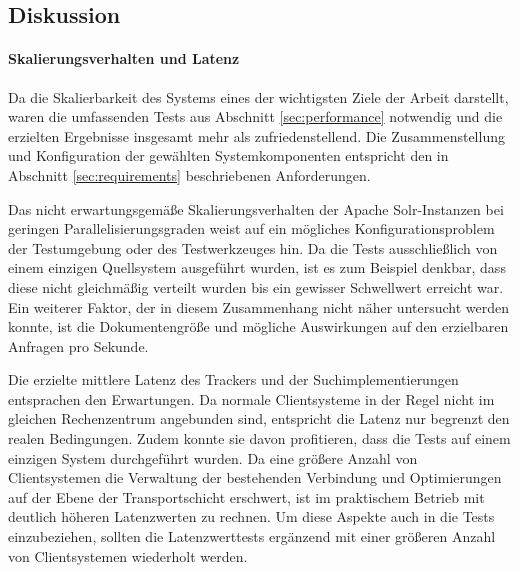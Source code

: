 \subsection{Diskussion} \label{sec:discuss}

\paragraph{Skalierungsverhalten und Latenz} Da die Skalierbarkeit des Systems eines der wichtigsten Ziele der Arbeit darstellt, waren die umfassenden Tests aus Abschnitt \ref{sec:performance} notwendig und die erzielten Ergebnisse insgesamt mehr als zufriedenstellend. Die Zusammenstellung und Konfiguration der gewählten Systemkomponenten entspricht den in Abschnitt \ref{sec:requirements} beschriebenen Anforderungen. %

Das nicht erwartungsgemäße Skalierungsverhalten der Apache Solr-Instanzen bei geringen Parallelisierungsgraden weist auf ein mögliches Konfigurationsproblem der Testumgebung oder des Testwerkzeuges hin. Da die Tests ausschließlich von einem einzigen Quellsystem ausgeführt wurden, ist es zum Beispiel denkbar, dass diese nicht gleichmäßig verteilt wurden bis ein gewisser Schwellwert erreicht war. Ein weiterer Faktor, der in diesem Zusammenhang nicht näher untersucht werden konnte, ist die Dokumentengröße und mögliche Auswirkungen auf den erzielbaren Anfragen pro Sekunde. \citep{solrperformance} %

Die erzielte mittlere Latenz des Trackers und der Suchimplementierungen entsprachen den Erwartungen. Da normale Clientsysteme in der Regel nicht im gleichen Rechenzentrum angebunden sind, entspricht die Latenz nur begrenzt den realen Bedingungen. Zudem konnte sie davon profitieren, dass die Tests auf einem einzigen System durchgeführt wurden. Da eine größere Anzahl von Clientsystemen die Verwaltung der bestehenden Verbindung und Optimierungen auf der Ebene der Transportschicht erschwert, ist im praktischem Betrieb mit deutlich höheren Latenzwerten zu rechnen. Um diese Aspekte auch in die Tests einzubeziehen, sollten die Latenzwerttests ergänzend mit einer größeren Anzahl von Clientsystemen wiederholt werden. \citep{jetty2008}

